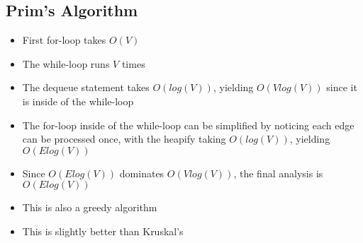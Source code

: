 \documentclass[12pt]{article}
\begin{document}
\subsection*{Prim's Algorithm}


\begin{itemize}
  \item First for-loop takes $O(V)$
  \item The while-loop runs $V$ times
  \item The dequeue statement takes $O(log(V))$, yielding $O(V log(V))$ since it is inside of the while-loop
  \item The for-loop inside of the while-loop can be simplified by noticing each edge can be processed once, with the heapify taking $O(log(V))$, yielding $O(E log(V))$
  \item Since $O(E log(V))$ dominates $O(V log(V))$, the final analysis is $O(E log(V))$
  \item This is also a greedy algorithm
  \item This is slightly better than Kruskal's
\end{itemize}
\end{document}
